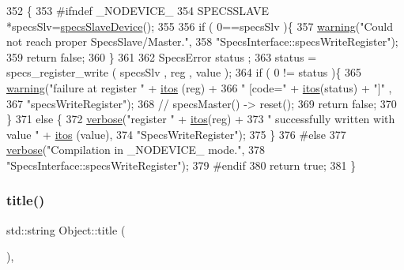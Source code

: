 \begin{DoxyCode}
352                                                            \{
353 \textcolor{preprocessor}{#ifndef \_NODEVICE\_
}
354   SPECSSLAVE *specsSlv=\hyperlink{classSpecsInterface_ac8d4711197f484f055533ec1e5ae01a1}{specsSlaveDevice}();
355 
356   \textcolor{keywordflow}{if} ( 0==specsSlv  )\{
357     \hyperlink{classObject_a65cd4fda577711660821fd2cd5a3b4c9}{warning}(\textcolor{stringliteral}{"Could not reach proper SpecsSlave/Master."},
358             \textcolor{stringliteral}{"SpecsInterface::specsWriteRegister"});
359     \textcolor{keywordflow}{return} \textcolor{keyword}{false};
360   \}
361   
362   SpecsError status ;
363   status = specs\_register\_write ( specsSlv , reg , value ); 
364   \textcolor{keywordflow}{if} ( 0 != status )\{
365     \hyperlink{classObject_a65cd4fda577711660821fd2cd5a3b4c9}{warning}(\textcolor{stringliteral}{"failure at register "} + \hyperlink{Tools_8h_af330027dbdafb9a30768b3613c553e60}{itos} (reg) +
366             \textcolor{stringliteral}{" [code="} + \hyperlink{Tools_8h_af330027dbdafb9a30768b3613c553e60}{itos}(status) + \textcolor{stringliteral}{"]"} ,
367             \textcolor{stringliteral}{"specsWriteRegister"});
368     \textcolor{comment}{//    specsMaster() -> reset();}
369     \textcolor{keywordflow}{return} \textcolor{keyword}{false};
370   \}
371   \textcolor{keywordflow}{else} \{
372     \hyperlink{classObject_a83d2db2df682907ea1115ad721c1c4a1}{verbose}(\textcolor{stringliteral}{"register "} + \hyperlink{Tools_8h_af330027dbdafb9a30768b3613c553e60}{itos}(reg) +
373             \textcolor{stringliteral}{" successfully written with value "} + \hyperlink{Tools_8h_af330027dbdafb9a30768b3613c553e60}{itos} (value),
374             \textcolor{stringliteral}{"SpecsWriteRegister"});
375   \}
376 \textcolor{preprocessor}{#else
}
377   \hyperlink{classObject_a83d2db2df682907ea1115ad721c1c4a1}{verbose}(\textcolor{stringliteral}{"Compilation in \_NODEVICE\_ mode."},
378           \textcolor{stringliteral}{"SpecsInterface::specsWriteRegister"});
379 \textcolor{preprocessor}{#endif
}
380   \textcolor{keywordflow}{return} \textcolor{keyword}{true};
381 \}
\end{DoxyCode}
\mbox{\label{classObject_a73a0f1a41828fdd8303dd662446fb6c3}} 
\subsubsection{\texorpdfstring{title()}{title()}}
{\footnotesize\ttfamily std\+::string Object\+::title (\begin{DoxyParamCaption}{ }\end{DoxyParamCaption})\hspace{0.3cm}{\ttfamily [inline]}, {\ttfamily [inherited]}}



